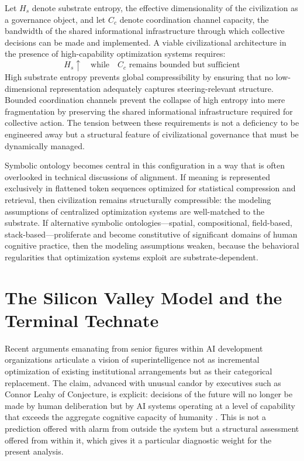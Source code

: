 \documentclass[12pt]{article}
\begin{document}
Let $H_s$ denote substrate entropy, the effective dimensionality of the civilization as a governance object, and let $C_c$ denote coordination channel capacity, the bandwidth of the shared informational infrastructure through which collective decisions can be made and implemented. A viable civilizational architecture in the presence of high-capability optimization systems requires:
\[
H_s \uparrow \quad \text{while} \quad C_c \text{ remains bounded but sufficient}
\]
High substrate entropy prevents global compressibility by ensuring that no low-dimensional representation adequately captures steering-relevant structure. Bounded coordination channels prevent the collapse of high entropy into mere fragmentation by preserving the shared informational infrastructure required for collective action. The tension between these requirements is not a deficiency to be engineered away but a structural feature of civilizational governance that must be dynamically managed.

Symbolic ontology becomes central in this configuration in a way that is often overlooked in technical discussions of alignment. If meaning is represented exclusively in flattened token sequences optimized for statistical compression and retrieval, then civilization remains structurally compressible: the modeling assumptions of centralized optimization systems are well-matched to the substrate. If alternative symbolic ontologies---spatial, compositional, field-based, stack-based---proliferate and become constitutive of significant domains of human cognitive practice, then the modeling assumptions weaken, because the behavioral regularities that optimization systems exploit are substrate-dependent.

\section{The Silicon Valley Model and the Terminal Technate}

Recent arguments emanating from senior figures within AI development organizations articulate a vision of superintelligence not as incremental optimization of existing institutional arrangements but as their categorical replacement. The claim, advanced with unusual candor by executives such as Connor Leahy of Conjecture, is explicit: decisions of the future will no longer be made by human deliberation but by AI systems operating at a level of capability that exceeds the aggregate cognitive capacity of humanity \citep{Leahy2024}. This is not a prediction offered with alarm from outside the system but a structural assessment offered from within it, which gives it a particular diagnostic weight for the present analysis.
\end{document}
